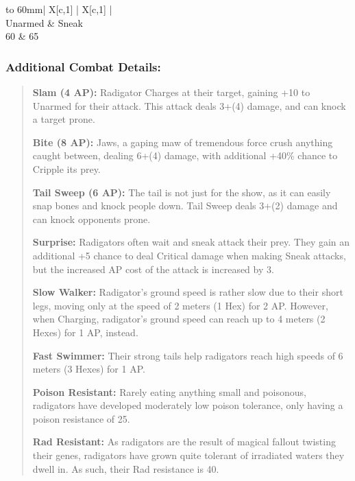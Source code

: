\documentclass[11pt,a4paper,twocolumn]{book}
\begin{document}
	\bigskip
	{
		\begin{tabu} to 60mm{| X[c,1] | X[c,1] |}
			\hline
			 \\ \hline
			Unarmed & Sneak                          \\
			60      & 65                             \\ \hline
		\end{tabu}
		
	}
	
	\subsubsection*{Additional Combat Details:}
	\begin{verse}
		\textbf{Slam (4 AP):} Radigator Charges at their target, gaining +10 to Unarmed for their attack. This attack deals 3+(4) damage, and can knock a target prone.
		
		\textbf{Bite (8 AP):} Jaws, a gaping maw of tremendous force crush anything caught between, dealing 6+(4) damage, with additional +40\% chance to Cripple its prey.
		
		\textbf{Tail Sweep (6 AP):} The tail is not just for the show, as it can easily snap bones and knock people down. Tail Sweep deals 3+(2) damage and can knock opponents prone.
		
		\textbf{Surprise:} Radigators often wait and sneak attack their prey. They gain an additional +5 chance to deal Critical damage when making Sneak attacks, but the increased AP cost of the attack is increased by 3.
		
		\textbf{Slow Walker:} Radigator's ground speed is rather slow due to their short legs, moving only at the speed of 2 meters (1 Hex) for 2 AP. However, when Charging, radigator's ground speed can reach up to 4 meters (2 Hexes) for 1 AP, instead.
		
		\textbf{Fast Swimmer:} Their strong tails help radigators reach high speeds of 6 meters (3 Hexes) for 1 AP.
		
		\textbf{Poison Resistant:} Rarely eating anything small and poisonous, radigators have developed moderately low poison tolerance, only having a poison resistance of 25.
		
		\textbf{Rad Resistant:} As radigators are the result of magical fallout twisting their genes, radigators have grown quite tolerant of irradiated waters they dwell in. As such, their Rad resistance is 40.
	\end{verse}
	
\end{document}
